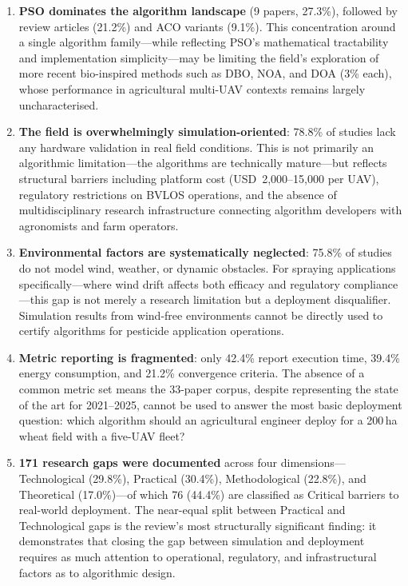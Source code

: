 \documentclass[review,3p,times]{elsarticle}
\begin{document}
\begin{enumerate}
  \item \textbf{PSO dominates the algorithm landscape} (9 papers, 27.3\%), followed by review articles (21.2\%) and ACO variants (9.1\%). This concentration around a single algorithm family---while reflecting PSO's mathematical tractability and implementation simplicity---may be limiting the field's exploration of more recent bio-inspired methods such as DBO, NOA, and DOA (3\% each), whose performance in agricultural multi-UAV contexts remains largely uncharacterised.

  \item \textbf{The field is overwhelmingly simulation-oriented}: 78.8\% of studies lack any hardware validation in real field conditions. This is not primarily an algorithmic limitation---the algorithms are technically mature---but reflects structural barriers including platform cost (USD~2,000--15,000 per UAV), regulatory restrictions on BVLOS operations, and the absence of multidisciplinary research infrastructure connecting algorithm developers with agronomists and farm operators.

  \item \textbf{Environmental factors are systematically neglected}: 75.8\% of studies do not model wind, weather, or dynamic obstacles. For spraying applications specifically---where wind drift affects both efficacy and regulatory compliance---this gap is not merely a research limitation but a deployment disqualifier. Simulation results from wind-free environments cannot be directly used to certify algorithms for pesticide application operations.

  \item \textbf{Metric reporting is fragmented}: only 42.4\% report execution time, 39.4\% energy consumption, and 21.2\% convergence criteria. The absence of a common metric set means the 33-paper corpus, despite representing the state of the art for 2021--2025, cannot be used to answer the most basic deployment question: which algorithm should an agricultural engineer deploy for a 200\,ha wheat field with a five-UAV fleet?

  \item \textbf{171 research gaps were documented} across four dimensions---Technological (29.8\%), Practical (30.4\%), Methodological (22.8\%), and Theoretical (17.0\%)---of which 76 (44.4\%) are classified as Critical barriers to real-world deployment. The near-equal split between Practical and Technological gaps is the review's most structurally significant finding: it demonstrates that closing the gap between simulation and deployment requires as much attention to operational, regulatory, and infrastructural factors as to algorithmic design.
\end{enumerate}
\end{document}
